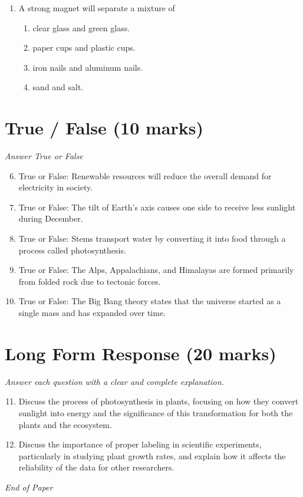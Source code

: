 \documentclass[12pt]{article}
\begin{document}
\begin{enumerate}[label=\arabic*.]
\begin{enumerate}[label=(\alph*)]
    \item fruits
    \item grains
    \item cheese
    \item vegetables
\end{enumerate}
\item A strong magnet will separate a mixture of
\begin{enumerate}[label=(\alph*)]
    \item clear glass and green glass.
    \item paper cups and plastic cups.
    \item iron nails and aluminum nails.
    \item sand and salt.
\end{enumerate}
\end{enumerate}

\section*{True / False (10 marks)}
\textit{Answer True or False}
\begin{enumerate}[label=\arabic*.]
\setcounter{enumi}{5}
\item True or False: Renewable resources will reduce the overall demand for electricity in society.
\item True or False: The tilt of Earth's axis causes one side to receive less sunlight during December.
\item True or False: Stems transport water by converting it into food through a process called photosynthesis.
\item True or False: The Alps, Appalachians, and Himalayas are formed primarily from folded rock due to tectonic forces.
\item True or False: The Big Bang theory states that the universe started as a single mass and has expanded over time.
\end{enumerate}

\section*{Long Form Response (20 marks)}
\textit{Answer each question with a clear and complete explanation.}
\begin{enumerate}[label=\arabic*.]
\setcounter{enumi}{10}
\item Discuss the process of photosynthesis in plants, focusing on how they convert sunlight into energy and the significance of this transformation for both the plants and the ecosystem.
\item Discuss the importance of proper labeling in scientific experiments, particularly in studying plant growth rates, and explain how it affects the reliability of the data for other researchers.
\end{enumerate}

\vfill
\noindent\textit{End of Paper}
\end{document}
